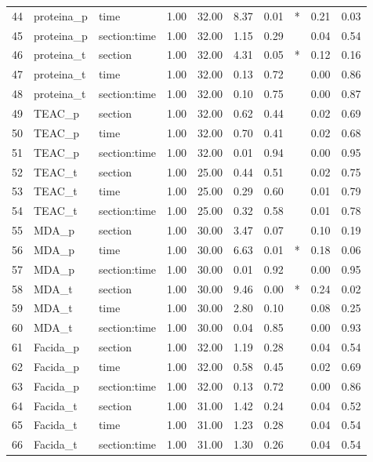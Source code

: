 \begin{table}[ht]
\begin{tabular}{rllrrrrlrr}
  44 & proteina\_p & time & 1.00 & 32.00 & 8.37 & 0.01 & * & 0.21 & 0.03 \\ 
  45 & proteina\_p & section:time & 1.00 & 32.00 & 1.15 & 0.29 &  & 0.04 & 0.54 \\ 
  46 & proteina\_t & section & 1.00 & 32.00 & 4.31 & 0.05 & * & 0.12 & 0.16 \\ 
  47 & proteina\_t & time & 1.00 & 32.00 & 0.13 & 0.72 &  & 0.00 & 0.86 \\ 
  48 & proteina\_t & section:time & 1.00 & 32.00 & 0.10 & 0.75 &  & 0.00 & 0.87 \\ 
  49 & TEAC\_p & section & 1.00 & 32.00 & 0.62 & 0.44 &  & 0.02 & 0.69 \\ 
  50 & TEAC\_p & time & 1.00 & 32.00 & 0.70 & 0.41 &  & 0.02 & 0.68 \\ 
  51 & TEAC\_p & section:time & 1.00 & 32.00 & 0.01 & 0.94 &  & 0.00 & 0.95 \\ 
  52 & TEAC\_t & section & 1.00 & 25.00 & 0.44 & 0.51 &  & 0.02 & 0.75 \\ 
  53 & TEAC\_t & time & 1.00 & 25.00 & 0.29 & 0.60 &  & 0.01 & 0.79 \\ 
  54 & TEAC\_t & section:time & 1.00 & 25.00 & 0.32 & 0.58 &  & 0.01 & 0.78 \\ 
  55 & MDA\_p & section & 1.00 & 30.00 & 3.47 & 0.07 &  & 0.10 & 0.19 \\ 
  56 & MDA\_p & time & 1.00 & 30.00 & 6.63 & 0.01 & * & 0.18 & 0.06 \\ 
  57 & MDA\_p & section:time & 1.00 & 30.00 & 0.01 & 0.92 &  & 0.00 & 0.95 \\ 
  58 & MDA\_t & section & 1.00 & 30.00 & 9.46 & 0.00 & * & 0.24 & 0.02 \\ 
  59 & MDA\_t & time & 1.00 & 30.00 & 2.80 & 0.10 &  & 0.08 & 0.25 \\ 
  60 & MDA\_t & section:time & 1.00 & 30.00 & 0.04 & 0.85 &  & 0.00 & 0.93 \\ 
  61 & Facida\_p & section & 1.00 & 32.00 & 1.19 & 0.28 &  & 0.04 & 0.54 \\ 
  62 & Facida\_p & time & 1.00 & 32.00 & 0.58 & 0.45 &  & 0.02 & 0.69 \\ 
  63 & Facida\_p & section:time & 1.00 & 32.00 & 0.13 & 0.72 &  & 0.00 & 0.86 \\ 
  64 & Facida\_t & section & 1.00 & 31.00 & 1.42 & 0.24 &  & 0.04 & 0.52 \\ 
  65 & Facida\_t & time & 1.00 & 31.00 & 1.23 & 0.28 &  & 0.04 & 0.54 \\ 
  66 & Facida\_t & section:time & 1.00 & 31.00 & 1.30 & 0.26 &  & 0.04 & 0.54 \\ 

\end{tabular}
\end{table}

